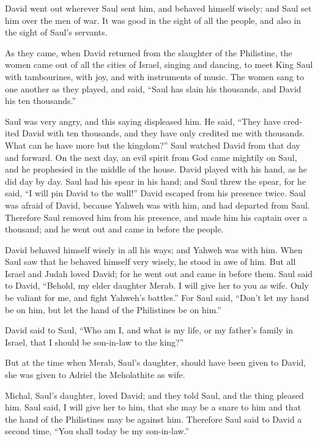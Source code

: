 \begin{paracol}{2}
\begin{otherlanguage}{english}
 David went out wherever Saul sent him, and behaved
himself wisely; and Saul set him over the men of war. It was good in the
sight of all the people, and also in the sight of Saul's servants.

 As they came, when David returned from the slaughter of
the Philistine, the women came out of all the cities of Israel, singing
and dancing, to meet King Saul with tambourines, with joy, and with
instruments of music.  The women sang to one another as
they played, and said, ``Saul has slain his thousands, and David his ten
thousands.''

 Saul was very angry, and this saying displeased him. He
said, ``They have credited David with ten thousands, and they have only
credited me with thousands. What can he have more but the kingdom?''
 Saul watched David from that day and forward.
 On the next day, an evil spirit from God came mightily
on Saul, and he prophesied in the middle of the house. David played with
his hand, as he did day by day. Saul had his spear in his hand;
 and Saul threw the spear, for he said, ``I will pin
David to the wall!'' David escaped from his presence twice.
 Saul was afraid of David, because Yahweh was with him,
and had departed from Saul.  Therefore Saul removed him
from his presence, and made him his captain over a thousand; and he went
out and came in before the people.

 David behaved himself wisely in all his ways; and Yahweh
was with him.  When Saul saw that he behaved himself very
wisely, he stood in awe of him.  But all Israel and Judah
loved David; for he went out and came in before them. 
Saul said to David, ``Behold, my elder daughter Merab. I will give her
to you as wife. Only be valiant for me, and fight Yahweh's battles.''
For Saul said, ``Don't let my hand be on him, but let the hand of the
Philistines be on him.''

 David said to Saul, ``Who am I, and what is my life, or
my father's family in Israel, that I should be son-in-law to the king?''

 But at the time when Merab, Saul's daughter, should have
been given to David, she was given to Adriel the Meholathite as wife.

 Michal, Saul's daughter, loved David; and they told
Saul, and the thing pleased him.  Saul said, I will give
her to him, that she may be a snare to him and that the hand of the
Philistines may be against him. Therefore Saul said to David a second
time, ``You shall today be my son-in-law.''


\end{otherlanguage}
\end{paracol}
